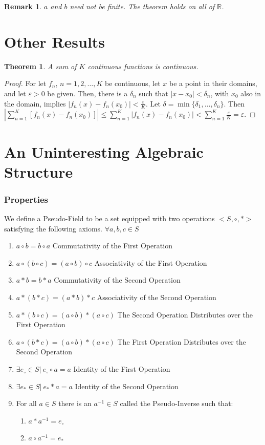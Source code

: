 \documentclass[oneside]{book}
\theoremstyle{mystyle}
\newtheorem{theorem}{Theorem}[section]
\newtheorem{remark}{Remark}[section]
\begin{document}
\begin{remark}
$a$ and $b$ need not be finite. The theorem holds on all of $\mathbb{R}$. 
\end{remark}
%
\section{Other Results}
%
\begin{theorem}
A sum of $K$ continuous functions is continuous. 
\end{theorem}
\begin{proof}
For let $f_n$, $n=1,2,\hdots,K$ be continuous, let $x$ be a point in their domains, and let $\varepsilon>0$ be given. Then, there is a $\delta_n$ such that $|x-x_0|<\delta_n$, with $x_0$ also in the domain, implies $|f_n(x)-f_n(x_0)|<\frac{\varepsilon}{K}$. Let $\delta = \min\{\delta_1,\hdots,\delta_n\}$. Then $|\sum_{n=1}^{K}[f_n(x)-f_n(x_0)]| \leq \sum_{n=1}^{K}|f_n(x)-f_n(x_0)| < \sum_{n=1}^{K} \frac{\varepsilon}{K} = \varepsilon$.
\end{proof}
%
\section{An Uninteresting Algebraic Structure}
%
\subsubsection{Properties}
\noindent We define a Pseudo-Field to be a set equipped with two operations $<S,\circ, *>$ satisfying the following axioms.
$\forall a,b,c \in S$
\begin{enumerate}
\item $a\circ b = b\circ a$ \hfill Commutativity of the First Operation
\item $a\circ (b\circ c)=(a \circ b)\circ c$ \hfill Associativity of the First Operation
\item $a*b = b*a$ \hfill Commutativity of the Second Operation
\item $a*(b*c) = (a*b)*c$ \hfill Associativity of the Second Operation
\item $a*(b\circ c)=(a\circ b)*(a\circ c)$ \hfill The Second Operation Distributes over the First Operation
\item $a\circ (b*c) = (a\circ b)*(a\circ c)$ \hfill The First Operation Distributes over the Second Operation
\item $\exists e_{\circ}\in S|\ e_{\circ}\circ a = a$ \hfill Identity of the First Operation
\item $\exists e_{*} \in S|\ e_{*}*a = a$ \hfill Identity of the Second Operation
\item For all $a\in S$ there is an $a^{-1}\in S$ called the Pseudo-Inverse such that:
\begin{enumerate}
\item $a*a^{-1} = e_{\circ}$
\item $a\circ a^{-1}=e_{*}$
\end{enumerate}
\end{enumerate}
\end{document}
